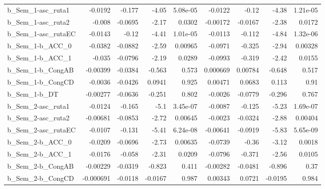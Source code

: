 \begin{tabular}{lrrrrrrrr}
b\_Sem\_1-asc\_ruta1    &     -0.0192 &       -0.177 &   -4.05 & 5.08e-05 &    -0.0122 &       -0.12 &        -4.38 &      1.21e-05 \\
b\_Sem\_1-asc\_ruta2    &      -0.008 &      -0.0695 &   -2.17 &   0.0302 &   -0.00172 &     -0.0167 &        -2.38 &        0.0172 \\
b\_Sem\_1-asc\_rutaEC   &     -0.0143 &        -0.12 &   -4.41 & 1.01e-05 &    -0.0113 &      -0.112 &        -4.84 &      1.32e-06 \\
b\_Sem\_1-b\_ACC\_0      &     -0.0382 &      -0.0882 &   -2.59 &  0.00965 &    -0.0971 &      -0.325 &        -2.94 &       0.00328 \\
b\_Sem\_1-b\_ACC\_1      &      -0.035 &      -0.0796 &   -2.19 &   0.0289 &    -0.0993 &      -0.319 &        -2.42 &        0.0155 \\
b\_Sem\_1-b\_CongAB     &    -0.00399 &      -0.0384 &  -0.563 &    0.573 &   0.000669 &     0.00784 &       -0.648 &         0.517 \\
b\_Sem\_1-b\_CongCD     &     -0.0036 &      -0.0426 &  0.0941 &    0.925 &    0.00471 &      0.0683 &        0.113 &          0.91 \\
b\_Sem\_1-b\_DT         &    -0.00277 &      -0.0636 &  -0.251 &    0.802 &    -0.0026 &     -0.0779 &       -0.296 &         0.767 \\
b\_Sem\_2-asc\_ruta1    &     -0.0124 &       -0.165 &    -5.1 & 3.45e-07 &    -0.0087 &      -0.125 &        -5.23 &      1.69e-07 \\
b\_Sem\_2-asc\_ruta2    &    -0.00681 &      -0.0853 &   -2.72 &  0.00645 &    -0.0023 &     -0.0324 &        -2.88 &       0.00404 \\
b\_Sem\_2-asc\_rutaEC   &     -0.0107 &       -0.131 &   -5.41 & 6.24e-08 &   -0.00641 &     -0.0919 &        -5.83 &      5.65e-09 \\
b\_Sem\_2-b\_ACC\_0      &     -0.0209 &      -0.0696 &   -2.73 &  0.00635 &    -0.0739 &       -0.36 &        -3.12 &        0.0018 \\
b\_Sem\_2-b\_ACC\_1      &     -0.0176 &       -0.058 &   -2.31 &   0.0209 &    -0.0796 &      -0.371 &        -2.56 &        0.0105 \\
b\_Sem\_2-b\_CongAB     &    -0.00229 &      -0.0319 &  -0.823 &    0.411 &   -0.00282 &     -0.0481 &       -0.896 &          0.37 \\
b\_Sem\_2-b\_CongCD     &   -0.000691 &      -0.0118 & -0.0167 &    0.987 &    0.00343 &      0.0721 &      -0.0195 &         0.984 \\

\end{tabular}

